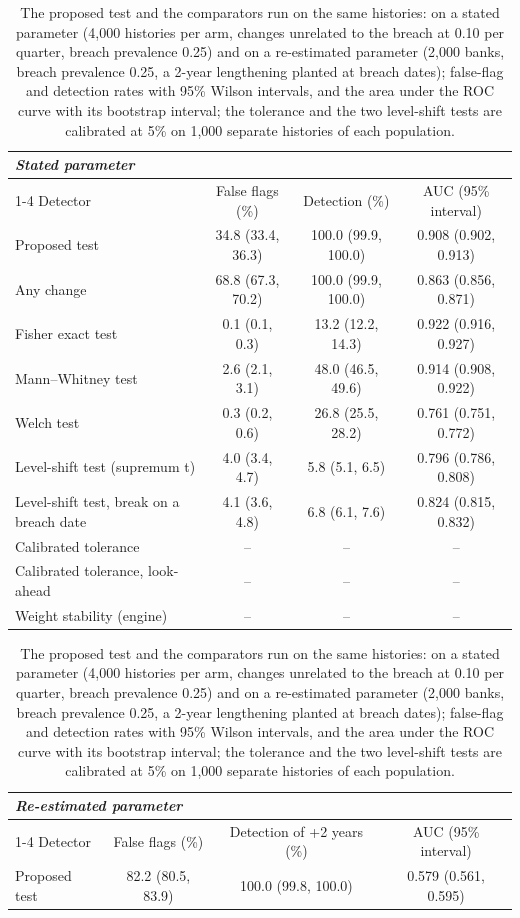 \begin{table}[htbp]
\centering
\footnotesize
\caption{The proposed test and the comparators run on the same histories: on a stated parameter (4,000 histories per arm, changes unrelated to the breach at 0.10 per quarter, breach prevalence 0.25) and on a re-estimated parameter (2,000 banks, breach prevalence 0.25, a 2-year lengthening planted at breach dates); false-flag and detection rates with 95\% Wilson intervals, and the area under the ROC curve with its bootstrap interval; the tolerance and the two level-shift tests are calibrated at 5\% on 1,000 separate histories of each population.}
\label{tab:main-results}
\begin{tabular}{p{5.2cm}ccc}
\toprule
\multicolumn{4}{l}{\textit{Stated parameter}} \\
\cmidrule(lr){1-4}
Detector & False flags (\%) & Detection (\%) & AUC (95\% interval) \\
\midrule
Proposed test & 34.8 (33.4, 36.3) & 100.0 (99.9, 100.0) & 0.908 (0.902, 0.913) \\
Any change & 68.8 (67.3, 70.2) & 100.0 (99.9, 100.0) & 0.863 (0.856, 0.871) \\
Fisher exact test & 0.1 (0.1, 0.3) & 13.2 (12.2, 14.3) & 0.922 (0.916, 0.927) \\
Mann--Whitney test & 2.6 (2.1, 3.1) & 48.0 (46.5, 49.6) & 0.914 (0.908, 0.922) \\
Welch test & 0.3 (0.2, 0.6) & 26.8 (25.5, 28.2) & 0.761 (0.751, 0.772) \\
Level-shift test (supremum t) & 4.0 (3.4, 4.7) & 5.8 (5.1, 6.5) & 0.796 (0.786, 0.808) \\
Level-shift test, break on a breach date & 4.1 (3.6, 4.8) & 6.8 (6.1, 7.6) & 0.824 (0.815, 0.832) \\
Calibrated tolerance & -- & -- & -- \\
Calibrated tolerance, look-ahead & -- & -- & -- \\
Weight stability (engine) & -- & -- & -- \\
\bottomrule
\end{tabular}
\par\medskip
\begin{tabular}{p{5.2cm}ccc}
\toprule
\multicolumn{4}{l}{\textit{Re-estimated parameter}} \\
\cmidrule(lr){1-4}
Detector & False flags (\%) & Detection of +2 years (\%) & AUC (95\% interval) \\
\midrule
Proposed test & 82.2 (80.5, 83.9) & 100.0 (99.8, 100.0) & 0.579 (0.561, 0.595) \\

\end{tabular}
\end{table}
